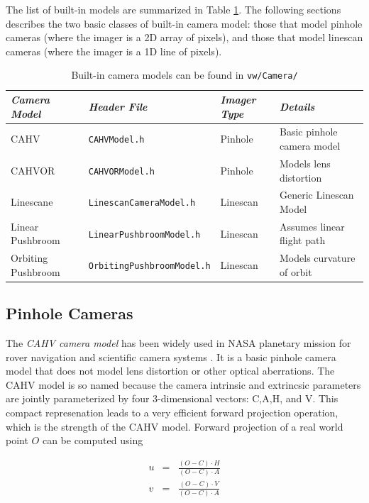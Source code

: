 The list of built-in models are summarized in Table
\ref{tab:camera-models}.  The following sections describes the two
basic classes of built-in camera model: those that model pinhole
cameras (where the imager is a 2D array of pixels), and those that
model linescan cameras (where the imager is a 1D line of pixels).

\begin{table}[tdp]
\begin{center}
\begin{tabular}{|l|l|l|l|}
\hline
{\em Camera Model} & {\em Header File} & {\em Imager Type} & {\em Details}\\
\hline CAHV         & {\tt CAHVModel.h} & Pinhole     & Basic pinhole camera model \\
CAHVOR       & {\tt CAHVORModel.h} & Pinhole     & Models lens distortion\\
Linescane     & {\tt LinescanCameraModel.h} & Linescan & Generic Linescan Model \\
Linear Pushbroom    & {\tt LinearPushbroomModel.h} & Linescan & Assumes linear flight path \\
Orbiting Pushbroom & {\tt OrbitingPushbroomModel.h} & Linescan & Models curvature of orbit \\
\hline
\end{tabular}
\end{center}
\label{tab:camera-models}
\caption{Built-in camera models can be found in {\tt vw/Camera/} }
\end{table}

\subsection{Pinhole Cameras}

The {\em CAHV camera model} has been widely used in NASA planetary
mission for rover navigation and scientific camera systems
\cite{yakimovsky78}.  It is a basic pinhole camera model that does not
model lens distortion or other optical aberrations.  The CAHV model is
so named because the camera intrinsic and extrincsic parameters are
jointly parameterized by four 3-dimensional vectors: C,A,H, and V.
This compact represenation leads to a very efficient forward
projection operation, which is the strength of the CAHV model.
Forward projection of a real world point $O$ can be computed using

\begin{eqnarray}
u & = & \frac{(O-C) \cdot H}{(O-C) \cdot A}\\
v & = & \frac{(O-C) \cdot V}{(O-C) \cdot A}
\end{eqnarray}

